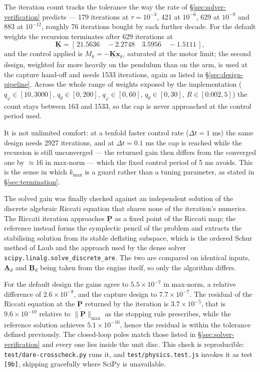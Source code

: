 \documentclass[12pt]{article}
\newcommand{\vb}[1]{{\underset{\tilde{}}{\mathbf{#1}}}}
\newcommand{\mb}[1]{\underline{\mathbf{#1}}}
\begin{document}
The iteration count tracks the tolerance the way the rate of \S\ref{sec:solver-verification} predicts --- 179 iterations at $\tau = 10^{-3}$, 421 at $10^{-6}$, 629 at $10^{-9}$ and 883 at $10^{-12}$, roughly 76 iterations bought by each further decade. For the default weights the recursion terminates after 629 iterations at
\[
\mb{K} = [\,21.5636 \quad -2.2748 \quad 3.5956 \quad -1.5111\,],
\]
and the control applied is $M_k = -\mb{K}\vb{x}{}_k$, saturated at the motor limit; the second design, weighted far more heavily on the pendulum than on the arm, is used at the capture hand-off and needs 1533 iterations, again as listed in \S\ref{sec:design-pipeline}. Across the whole range of weights exposed by the implementation ($q_\varphi \in [10, 3000]$, $q_\theta \in [0, 200]$, $q_{\dot{\varphi}} \in [0, 60]$, $q_{\dot{\theta}} \in [0, 30]$, $R \in [0.002, 5]$) the count stays between 163 and 1533, so the cap is never approached at the control period used.

It is not unlimited comfort: at a tenfold faster control rate ($\Delta t = 1$ ms) the same design needs 2927 iterations, and at $\Delta t = 0.1$ ms the cap is reached while the recursion is still unconverged --- the returned gain then differs from the converged one by $\approx 16$ in max-norm --- which the fixed control period of 5 ms avoids. This is the sense in which $k_{\max}$ is a guard rather than a tuning parameter, as stated in \S\ref{sec:termination}.

The solved gain was finally checked against an independent solution of the discrete algebraic Riccati equation that shares none of the iteration's numerics. The Riccati iteration approaches $\mb{P}$ as a fixed point of the Riccati map; the reference instead forms the symplectic pencil of the problem and extracts the stabilising solution from its stable deflating subspace, which is the ordered Schur method of Laub \cite{Laub1979} and the approach used by the dense solver \texttt{scipy.linalg.solve\_discrete\_are}. The two are compared on identical inputs, $\mb{A}{}_d$ and $\mb{B}{}_d$ being taken from the engine itself, so only the algorithm differs.

For the default design the gains agree to $5.5 \times 10^{-7}$ in max-norm, a relative difference of $2.6 \times 10^{-8}$, and the capture design to $7.7 \times 10^{-7}$. The residual of the Riccati equation at the $\mb{P}$ returned by the iteration is $3.7 \times 10^{-5}$, that is $9.6 \times 10^{-10}$ relative to $\|\mb{P}\|_{\max}$ as the stopping rule prescribes, while the reference solution achieves $5.1 \times 10^{-10}$, hence the residual is within the tolerance defined previously. The closed-loop poles match those listed in \S\ref{sec:solver-verification} and every one lies inside the unit disc. This check is reproducible: \texttt{test/dare-crosscheck.py} runs it, and \texttt{test/physics.test.js} invokes it as test \texttt{[9b]}, skipping gracefully where SciPy is unavailable.
\end{document}
